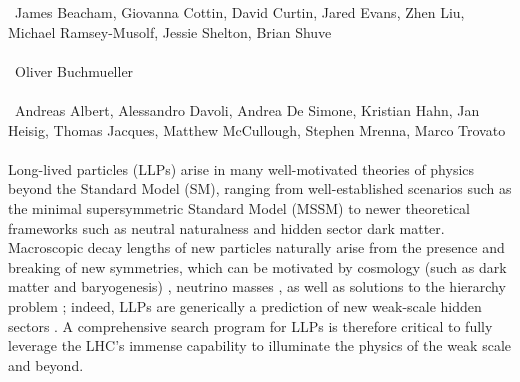 ~James Beacham, Giovanna Cottin, David Curtin, Jared Evans, Zhen Liu, Michael Ramsey-Musolf, Jessie Shelton, Brian Shuve\\
\text{ \; }\\
~Oliver Buchmueller\\
\text{ \; }\\
~Andreas Albert, Alessandro Davoli, Andrea De Simone, Kristian Hahn, Jan Heisig, Thomas Jacques, Matthew McCullough, Stephen Mrenna, Marco Trovato
\text{ \; }\\
\text{ \; }\\


\noindent Long-lived particles (LLPs) arise in many well-motivated theories of physics beyond the Standard Model (SM), ranging from  well-established scenarios such as the minimal supersymmetric Standard Model (MSSM) to newer theoretical frameworks such as neutral naturalness and hidden sector dark matter.  Macroscopic decay lengths of new particles naturally arise from the presence and breaking of new symmetries, which can be motivated by cosmology (such as dark matter and baryogenesis) \cite{Bouquet:1986mq, Campbell:1990fa, Cui:2012jh, Barry:2013nva, Cui:2014twa, Ipek:2016bpf,Baumgart:2009tn, Kaplan:2009ag,
  Chan:2011aa, Dienes:2011ja, Dienes:2012yz, Kim:2013ivd}, neutrino masses \cite{Helo:2013esa, Antusch:2016vyf,Graesser:2007yj, Graesser:2007pc, Izaguirre:2015pga,Maiezza:2015lza, Batell:2016zod}, as well as solutions to the hierarchy problem  \cite{Giudice:1998bp,Burdman:2006tz, Cai:2008au, Chacko:2005pe,Fan:2011yu,Barbier:2004ez, Csaki:2013jza,Arvanitaki:2012ps, ArkaniHamed:2012gw}; indeed, LLPs are generically a prediction of new weak-scale hidden sectors \cite{Chen:1995yu,Thomas:1998wy,Feng:1999fu,Strassler:2006im,Strassler:2006ri,Strassler:2006qa,Han:2007ae,Strassler:2008bv,Strassler:2008fv}.  A comprehensive search program for LLPs is therefore critical to fully leverage the LHC's immense capability to illuminate the physics of the weak scale and beyond. 

